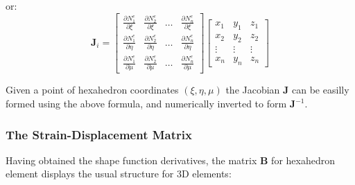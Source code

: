 \documentclass[10pt,b5paper,titlepage]{book}
\newcommand{\m}{\mathbf}
\begin{document}
or:
\begin{equation}
    \m{J}_i =
    \begin{bmatrix}
        \frac{\partial N_1^e}{\partial \xi} &
        \frac{\partial N_2^e}{\partial \xi} &
        \dots &
        \frac{\partial N_n^e}{\partial \xi}\\
        \frac{\partial N_1^e}{\partial \eta} &
        \frac{\partial N_2^e}{\partial \eta} &
        \dots &
        \frac{\partial N_n^e}{\partial \eta}\\
        \frac{\partial N_1^e}{\partial \mu} &
        \frac{\partial N_2^e}{\partial \mu} &
        \dots &
        \frac{\partial N_n^e}{\partial \mu}
    \end{bmatrix}
    \begin{bmatrix}
        x_1 & y_1 & z_1 \\
        x_2 & y_2 & z_2 \\
        \vdots & \vdots & \vdots \\
        x_n & y_n & z_n
    \end{bmatrix}
\end{equation}


Given a point of hexahedron coordinates $ ( \xi, \eta, \mu ) $ the Jacobian $ \m{J} $
can be easilly formed using the above formula, and numerically inverted to form
$ \m{J}^{-1} $.


\subsubsection{The Strain-Displacement Matrix}

Having obtained the shape function derivatives, the matrix $ \m{B} $ for hexahedron
element displays the usual structure for 3D elements:
\end{document}
